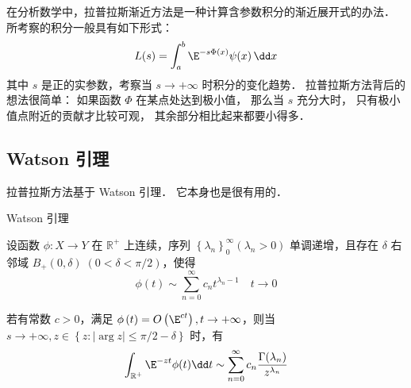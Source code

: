 

在分析数学中，拉普拉斯渐近方法是一种计算含参数积分的渐近展开式的办法． 所考察的积分一般具有如下形式：
\begin{equation}\label{LapAsm_eq1}
L(s)=\int_a^b\E^{-s\Phi(x)}\psi(x)\,\dd x
\end{equation}
其中 $s$ 是正的实参数，考察当 $s\to+\infty$ 时积分的变化趋势． 拉普拉斯方法背后的想法很简单： 如果函数 $\Phi$ 在某点处达到极小值， 那么当 $s$ 充分大时， 只有极小值点附近的贡献才比较可观， 其余部分相比起来都要小得多．

\subsection{Watson 引理}
拉普拉斯方法基于 Watson 引理． 它本身也是很有用的．

\begin{lemma}{Watson 引理}

设函数 $\phi:X\to Y$ 在 $\mathbb{R}^+$ 上连续，序列 $\left\{\lambda_n\right\}_0^\infty\left(\lambda_n>0\right)$ 单调递增，且存在 $\delta$ 右邻域 $B_{+}(0,\delta)\;(0<\delta<\pi/2)$，使得
\begin{equation}\label{LapAsm_eq2}
  \phi\left(t\right)\sim\sum_{n=0}^{\infty}{c_nt^{\lambda_n-1}}\quad t\to0
\end{equation}

若有常数 $c>0$，满足 $\phi\left(t\right)=O\left(\E^{ct}\right),t\to+\infty$，则当 $s\to+\infty,z\in{\left\{z:\left|\arg{z}\right|\le\pi/2-\delta\right\}}$ 时，有
\begin{equation}\label{LapAsm_eq3}
\int_{\mathbb{R}^+}\E^{-zt}\phi(t)\dd t\sim\sum_{n=0}^{\infty}{c_n}\frac{\Gamma(\lambda_n)}{z^{\lambda_n}}  
\end{equation}
\end{lemma}

